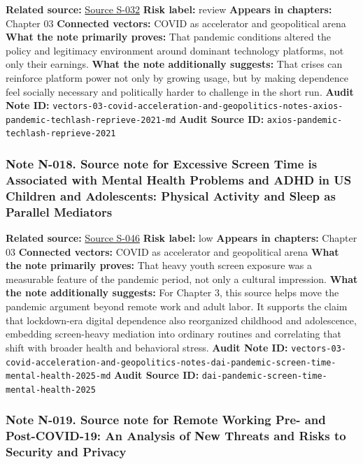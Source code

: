 \documentclass[
  american,
  11pt,
  letterpaper,
]{article}
\begin{document}
\textbf{Related source:}
\hyperref[source-s-032-pandemic-provides-a-techlash-reprieve]{Source
S-032} \textbf{Risk label:} review \textbf{Appears in chapters:} Chapter
03 \textbf{Connected vectors:} COVID as accelerator and geopolitical
arena \textbf{What the note primarily proves:} That pandemic conditions
altered the policy and legitimacy environment around dominant technology
platforms, not only their earnings. \textbf{What the note additionally
suggests:} That crises can reinforce platform power not only by growing
usage, but by making dependence feel socially necessary and politically
harder to challenge in the short run. \textbf{Audit Note ID:}
\texttt{vectors-03-covid-acceleration-and-geopolitics-notes-axios-pandemic-techlash-reprieve-2021-md}
\textbf{Audit Source ID:} \texttt{axios-pandemic-techlash-reprieve-2021}

\subsubsection{Note N-018. Source note for Excessive Screen Time is
Associated with Mental Health Problems and ADHD in US Children and
Adolescents: Physical Activity and Sleep as Parallel
Mediators}\label{note-n-018-vectors-03-covid-acceleration-and-geopolitics-notes-dai-pandemic-screen-time-mental-health-2025-md}

\textbf{Related source:}
\hyperref[source-s-046-excessive-screen-time-is-associated-with-mental-health-problems-and-adhd-in-us-children-and-adolescents-physical-activity-and-sleep-as-parallel-mediators]{Source
S-046} \textbf{Risk label:} low \textbf{Appears in chapters:} Chapter 03
\textbf{Connected vectors:} COVID as accelerator and geopolitical arena
\textbf{What the note primarily proves:} That heavy youth screen
exposure was a measurable feature of the pandemic period, not only a
cultural impression. \textbf{What the note additionally suggests:} For
Chapter 3, this source helps move the pandemic argument beyond remote
work and adult labor. It supports the claim that lockdown-era digital
dependence also reorganized childhood and adolescence, embedding
screen-heavy mediation into ordinary routines and correlating that shift
with broader health and behavioral stress. \textbf{Audit Note ID:}
\texttt{vectors-03-covid-acceleration-and-geopolitics-notes-dai-pandemic-screen-time-mental-health-2025-md}
\textbf{Audit Source ID:}
\texttt{dai-pandemic-screen-time-mental-health-2025}

\subsubsection{Note N-019. Source note for Remote Working Pre- and
Post-COVID-19: An Analysis of New Threats and Risks to Security and
Privacy}\label{note-n-019-vectors-03-covid-acceleration-and-geopolitics-notes-nurse-remote-working-security-privacy-2021-md}
\end{document}
